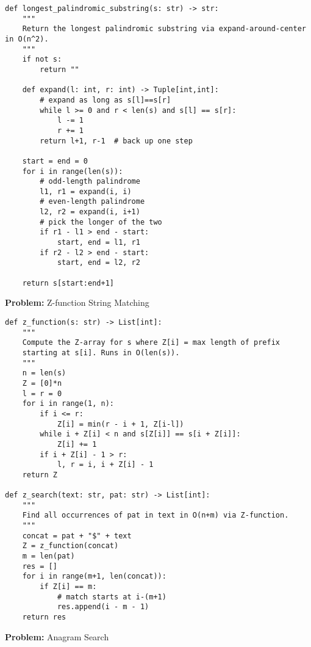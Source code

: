 \begin{verbatim}
def longest_palindromic_substring(s: str) -> str:
    """
    Return the longest palindromic substring via expand‐around‐center in O(n^2).
    """
    if not s:
        return ""

    def expand(l: int, r: int) -> Tuple[int,int]:
        # expand as long as s[l]==s[r]
        while l >= 0 and r < len(s) and s[l] == s[r]:
            l -= 1
            r += 1
        return l+1, r-1  # back up one step

    start = end = 0
    for i in range(len(s)):
        # odd-length palindrome
        l1, r1 = expand(i, i)
        # even-length palindrome
        l2, r2 = expand(i, i+1)
        # pick the longer of the two
        if r1 - l1 > end - start:
            start, end = l1, r1
        if r2 - l2 > end - start:
            start, end = l2, r2

    return s[start:end+1]

\end{verbatim}
\noindent\textbf{Problem:} Z-function String Matching
\begin{verbatim}
def z_function(s: str) -> List[int]:
    """
    Compute the Z-array for s where Z[i] = max length of prefix
    starting at s[i]. Runs in O(len(s)).
    """
    n = len(s)
    Z = [0]*n
    l = r = 0
    for i in range(1, n):
        if i <= r:
            Z[i] = min(r - i + 1, Z[i-l])
        while i + Z[i] < n and s[Z[i]] == s[i + Z[i]]:
            Z[i] += 1
        if i + Z[i] - 1 > r:
            l, r = i, i + Z[i] - 1
    return Z

def z_search(text: str, pat: str) -> List[int]:
    """
    Find all occurrences of pat in text in O(n+m) via Z-function.
    """
    concat = pat + "$" + text
    Z = z_function(concat)
    m = len(pat)
    res = []
    for i in range(m+1, len(concat)):
        if Z[i] == m:
            # match starts at i-(m+1)
            res.append(i - m - 1)
    return res
\end{verbatim}
\noindent\textbf{Problem:} Anagram Search
